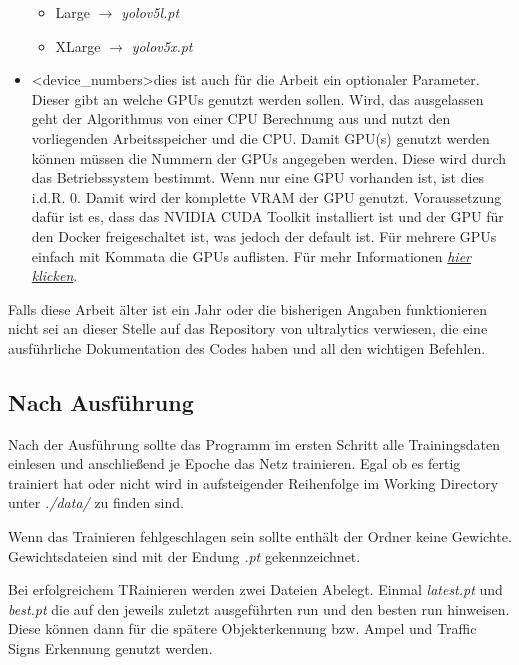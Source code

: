 \begin{itemize}
\begin{itemize}
        \item Large $\rightarrow $ \textit{yolov5l.pt}
        \item XLarge $\rightarrow $ \textit{yolov5x.pt}
    \end{itemize}
    \item \textless device\_numbers\textgreater dies ist auch für die Arbeit ein optionaler Parameter. Dieser gibt an welche GPUs genutzt werden sollen. Wird, das ausgelassen geht der Algorithmus von einer CPU Berechnung aus und nutzt den vorliegenden Arbeitsspeicher und die CPU. Damit GPU(s) genutzt werden können müssen die Nummern der GPUs angegeben werden. Diese wird durch das Betriebssystem bestimmt. Wenn nur eine GPU vorhanden ist, ist dies i.d.R. 0. Damit wird der komplette VRAM der GPU genutzt. Voraussetzung dafür ist es, dass das NVIDIA CUDA Toolkit installiert ist und der GPU für den Docker freigeschaltet ist, was jedoch der default ist. Für mehrere GPUs einfach mit Kommata die GPUs auflisten. Für mehr Informationen \textit{\href{https://github.com/ultralytics/yolov5/issues/475}{hier klicken}}.
\end{itemize}

Falls diese Arbeit älter ist ein Jahr oder die bisherigen Angaben funktionieren nicht sei an dieser Stelle auf das Repository von ultralytics verwiesen, die eine ausführliche Dokumentation des Codes haben und all den wichtigen Befehlen.

\subsection{Nach Ausführung}
\label{sec:after_exec}
Nach der Ausführung sollte das Programm im ersten Schritt alle Trainingsdaten einlesen und anschließend je Epoche das Netz trainieren. Egal ob es fertig trainiert hat oder nicht wird in aufsteigender Reihenfolge im Working Directory unter \textit{./data/} zu finden sind. 

Wenn das Trainieren fehlgeschlagen sein sollte enthält der Ordner keine Gewichte. Gewichtsdateien sind mit der Endung \textit{.pt} gekennzeichnet.

Bei erfolgreichem TRainieren werden zwei Dateien Abelegt. Einmal \textit{latest.pt} und \textit{best.pt} die auf den jeweils zuletzt ausgeführten run und den besten run hinweisen. Diese können dann für die spätere Objekterkennung bzw. Ampel und Traffic Signs Erkennung genutzt werden.

